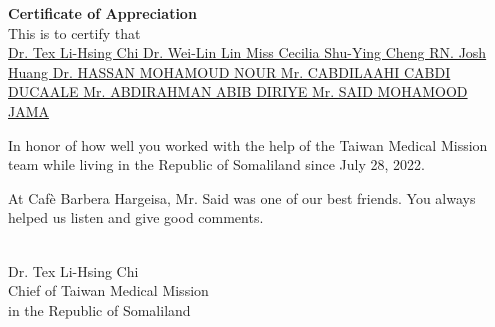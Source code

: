 \documentclass[a4paper, landscape]{article}
\newcommand{\members}[1]{%
    \ifcase#1
    \or Dr. Tex Li-Hsing Chi
    \or Dr. Wei-Lin Lin
    \or Miss Cecilia Shu-Ying Cheng
    \or RN. Josh Huang
    \or Dr. HASSAN MOHAMOUD NOUR %
    \or Mr. CABDILAAHI CABDI DUCAALE
    \or Mr. ABDIRAHMAN ABIB DIRIYE %
    \or Mr. SAID MOHAMOOD JAMA %
    \fi
}
\begin{document}
\begin{center}

{\Huge\textbf{Certificate of Appreciation}}\\[0.6cm]

\raisebox{-0.6\height}{}  \hspace{0.3cm}
This is to certify that \hspace{0.3cm}
 \\[0.4cm]

{\Huge\underline{\members{8}}}\\[0.2cm]



\begin{flushleft}
\Large
In honor of how well you worked with the help of the Taiwan Medical Mission team while living in the Republic of Somaliland since July 28, 2022.

At Cafè Barbera Hargeisa, Mr. Said was one of our best friends. You always helped us listen and give good comments.



\end{flushleft}\\[0.5cm]



\large
Dr. Tex Li-Hsing Chi\\
Chief of Taiwan Medical Mission\\
in the Republic of Somaliland

\end{center}
\end{document}
